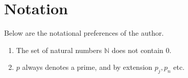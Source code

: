 \section*{Notation}
Below are the notational preferences of the author.
\begin{enumerate}
    \item The set of natural numbers $\mathbb{N}$ does not contain $0$.
    \item $p$ always denotes a prime, and by extension $p_j,p_n$ etc.
\end{enumerate}